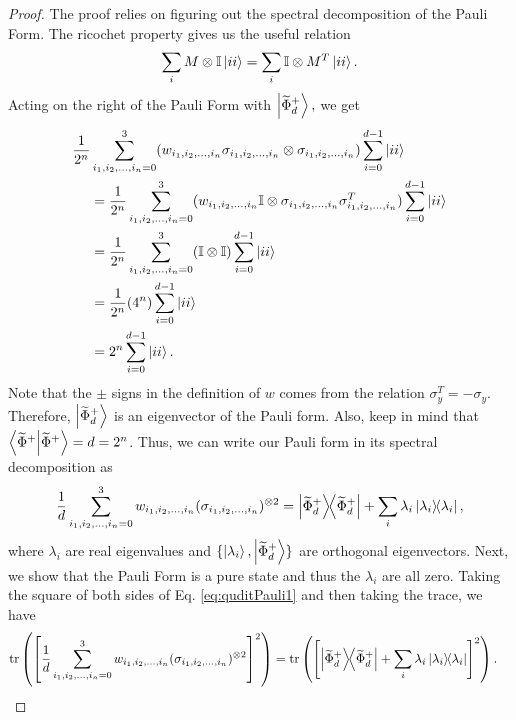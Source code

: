 \documentclass[12pt]{iopart}
\begin{document}
\begin{proof}
    The proof relies on figuring out the spectral decomposition of the Pauli Form. The ricochet property gives us the useful relation
    \begin{align}
        \sum_i M\otimes \mathbb{I} \ket{ii}=\sum_i \mathbb{I} \otimes M^T\ket{ii}.
    \end{align}
    Acting on the right of the Pauli Form with $\ket{\widetilde{\Phi}^+_d},$ we get
    \begin{align}
        \notag\dfrac{1}{2^{n}}&\sum_{i_1,i_2,...,i_{n}=0}^{3}(w_{i_1,i_2,...,i_{n}}\sigma_{i_1,i_2,...,i_{n}}\otimes\sigma_{i_1,i_2,...,i_{n}})\sum_{i=0}^{d-1}\ket{ii} \\
        \notag&=\dfrac{1}{2^{n}}\sum_{i_1,i_2,...,i_{n}=0}^{3}(w_{i_1,i_2,...,i_{n}}\mathbb{I}\otimes\sigma_{i_1,i_2,...,i_{n}}\sigma_{i_1,i_2,...,i_{n}}^T)\sum_{i=0}^{d-1}\ket{ii}\\
        \notag&=\dfrac{1}{2^{n}}\sum_{i_1,i_2,...,i_{n}=0}^{3}(\mathbb{I}\otimes\mathbb{I})\sum_{i=0}^{d-1}\ket{ii}\\
        \notag&=\dfrac{1}{2^{n}}(4^{n})\sum_{i=0}^{d-1}\ket{ii}\\
        &=2^{n}\sum_{i=0}^{d-1}\ket{ii}.
    \end{align}
    Note that the $\pm$ signs in the definition of $w$ comes from the relation $\sigma_y^T = - \sigma_y$. Therefore, $\ket{\widetilde\Phi^+_d}$ is an eigenvector of the Pauli form. Also, keep in mind that $\ip{\widetilde\Phi^+}=d=2^{n}$. Thus, we can write our Pauli form in its spectral decomposition as
    \begin{align}\label{eq:quditPauli1}
        \dfrac{1}{d}\sum_{i_1,i_2,...,i_{n}=0}^{3}w_{i_1,i_2,...,i_{n}}(\sigma_{i_1,i_2,...,i_{n}})^{\otimes 2}=\op{\widetilde\Phi_d^+}+\sum_i\lambda_i\op{\lambda_i},
    \end{align}
    where $\lambda_i$ are real eigenvalues and $\{\ket{\lambda_i},\ket{\widetilde\Phi^+_d}\}$ are orthogonal eigenvectors. Next, we show that the Pauli Form is a pure state and thus the $\lambda_i$ are all zero. Taking the square of both sides of Eq. \eqref{eq:quditPauli1} and then taking the trace, we have
    \begin{align}\label{eq:quditPauli2}
        \tr\left(\left[\dfrac{1}{d}\sum_{i_1,i_2,...,i_{n}=0}^{3}w_{i_1,i_2,...,i_{n}}(\sigma_{i_1,i_2,...,i_{n}})^{\otimes 2}
        \right]^2\right)&=\tr\left(\left[\op{\widetilde\Phi_d^+}+\sum_i\lambda_i\op{\lambda_i}\right]^2\right).
    \end{align}

\end{proof}
\end{document}
